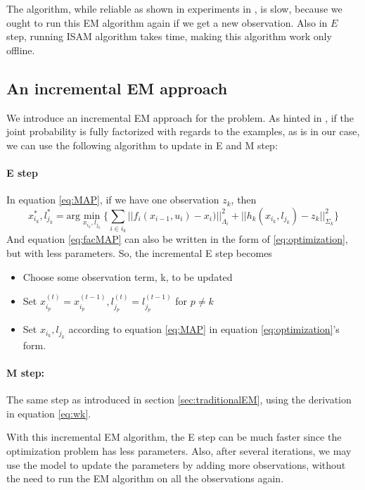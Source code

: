 The algorithm, while reliable as shown in experiments in \cite{haehnel03iros}, is slow, because we ought to run this EM algorithm again if we get a new observation. Also in $E$ step, running ISAM algorithm takes time, making this algorithm work only offline. 
\subsection{An incremental EM approach}
We introduce an incremental EM approach for the problem. As hinted in \cite{neal1998EM}, if the joint probability is fully factorized with regards to the examples, as is in our case, we can use the following algorithm to update in E and M step:
\paragraph{E step} 
In equation \ref{eq:MAP}, if we have one observation $z_k$, then
\begin{equation}
x_{i_k}^*, l_{j_k}^* = \text{arg}\min\limits_{x_{i_k}, l_{j_k}}\{\sum\limits_{i \in i_k}||f_i(x_{i-1}, u_i) - x_i)||^2_{\Lambda_i} + ||h_k(x_{i_k}, l_{j_k}) - z_k||^2_{\Sigma_k}\}
\label{eq:facMAP}
\end{equation}
And equation \ref{eq:facMAP} can also be written in the form of \ref{eq:optimization}, but with less parameters. So, the incremental E step becomes
\begin{itemize}
\item Choose some observation term, k, to be updated
\item Set $x_{i_p}^{(t)} = x_{i_p}^{(t-1)}, l_{j_p}^{(t)} = l_{j_p}^{(t-1)}$ for $p \neq k$
\item Set $x_{i_k}, l_{j_k}$ according to equation \ref{eq:MAP} in equation \ref{eq:optimization}'s form.
\end{itemize}
\paragraph{M step:} The same step as introduced in section \ref{sec:traditionalEM}, using the derivation in equation \ref{eq:wk}.

With this incremental EM algorithm, the E step can be much faster since the optimization problem has less parameters. Also, after several iterations, we may use the model to update the parameters by adding more observations, without the need to run the EM algorithm on all the observations again.




